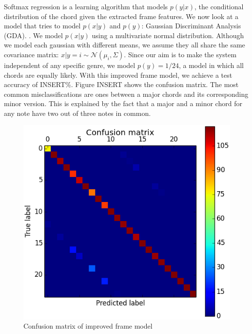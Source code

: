 \documentclass{article}
\begin{document}
Softmax regression is a learning algorithm that models $p(y|x)$, the conditional distribution of the chord given the extracted frame features. We now look at a model that tries to model $p(x|y)$ and $p(y)$: Gaussian Discriminant Analysis (GDA). \cite{jiang}. We model $p(x|y)$ using a multivariate normal distribution. Although we model each gaussian with different means, we assume they all share the same covariance matrix: $x|y=i \sim \mathcal{N}$$(\mu_i, \Sigma)$. Since our aim is to make the system independent of any specific genre, we model $p(y) = 1/24$, a model in which all chords are equally likely. With this improved frame model, we achieve a test accuracy of INSERT\%. Figure INSERT shows the confusion matrix. The most common misclassifications are ones between a major chords and its corresponding minor version. This is explained by the fact that a major and a minor chord for any note have two out of three notes in common. 

\begin{figure}[ht]
\vskip 0.2in
\begin{center}
\centerline{\includegraphics[width=\columnwidth]{conf}}
\caption{Confusion matrix of improved frame model}
\label{icml-historical}
\end{center}
\vskip -0.2in
\end{figure}
\end{document}
